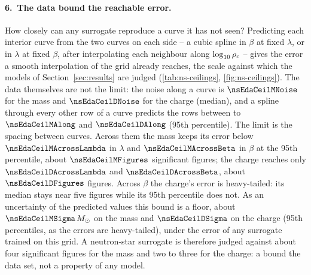 \paragraph{6.\ The data bound the reachable error.}
How closely can any surrogate reproduce a curve it has not seen? Predicting each interior curve from the two curves on each side -- a cubic spline in $\beta$ at fixed $\lambda$, or in $\lambda$ at fixed $\beta$, after interpolating each neighbour along $\log_{10}\rho_c$ -- gives the error a smooth interpolation of the grid already reaches, the scale against which the models of Section~\ref{sec:results} are judged (\cref{tab:ns-ceilings}, \cref{fig:ns-ceilings}). The data themselves are not the limit: the noise along a curve is $\nsEdaCeilMNoise$ for the mass and $\nsEdaCeilDNoise$ for the charge (median), and a spline through every other row of a curve predicts the rows between to $\nsEdaCeilMAlong$ and $\nsEdaCeilDAlong$ (95th percentile). The limit is the spacing between curves. Across them the mass keeps its error below $\nsEdaCeilMAcrossLambda$ in $\lambda$ and $\nsEdaCeilMAcrossBeta$ in $\beta$ at the 95th percentile, about $\nsEdaCeilMFigures$ significant figures; the charge reaches only $\nsEdaCeilDAcrossLambda$ and $\nsEdaCeilDAcrossBeta$, about $\nsEdaCeilDFigures$ figures. Across $\beta$ the charge's error is heavy-tailed: its median stays near five figures while its 95th percentile does not.
As an uncertainty of the predicted values this bound is a floor, about $\nsEdaCeilMSigma\,\Msun$ on the mass and $\nsEdaCeilDSigma$ on the charge (95th percentiles, as the errors are heavy-tailed), under the error of any surrogate trained on this grid. A neutron-star surrogate is therefore judged against about four significant figures for the mass and two to three for the charge: a bound the data set, not a property of any model.
